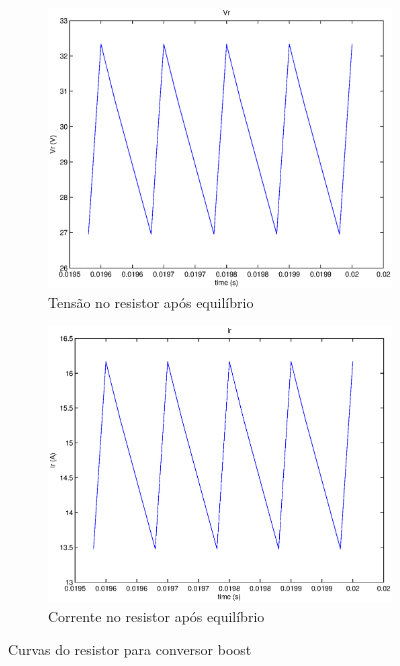 \documentclass{article}
\begin{document}
\begin{figure}[H]
\begin{subfigure}[b]{0.4\linewidth}
		\includegraphics[width=\linewidth]{matlab/boost/b_vrst}
		\caption{Tensão no resistor após equilíbrio}
	\end{subfigure}
	\begin{subfigure}[b]{0.4\linewidth}
		\centering
		\includegraphics[width=\linewidth]{matlab/boost/b_irst}
		\caption{Corrente no resistor após equilíbrio}
	\end{subfigure}
	\caption{Curvas do resistor para conversor boost}
	\label{fig:bor}
\end{figure}
\end{document}
